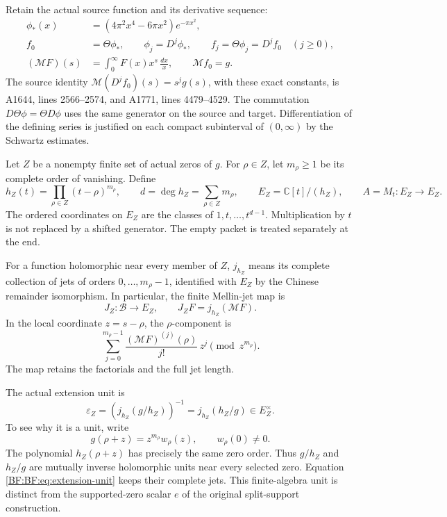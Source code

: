Retain the actual source function and its derivative sequence:
\begin{equation}
\begin{split}
\phi_*(x)&=(4\pi^2x^4-6\pi x^2)e^{-\pi x^2},\\
f_0&=\Theta\phi_*,
\qquad \phi_j=D^j\phi_*,
\qquad f_j=\Theta\phi_j=D^jf_0\quad(j\ge0),\\
(\mathcal MF)(s)&=\int_0^\infty F(x)x^s\,\frac{dx}{x},
\qquad \mathcal Mf_0=g.
\end{split}
\tag{BF.02}\label{BF:BF:eq:theta-source}
\end{equation}
The source identity \(\mathcal M(D^jf_0)(s)=s^jg(s)\), with these exact
constants, is A1644, lines 2566--2574, and A1771, lines 4479--4529.
The commutation \(D\Theta\phi=\Theta D\phi\) uses the same generator on
the source and target.  Differentiation of the defining series is
justified on each compact subinterval of \((0,\infty)\) by the
Schwartz estimates.

Let \(Z\) be a nonempty finite set of actual zeros of \(g\).  For
\(\rho\in Z\), let \(m_\rho\ge1\) be its complete order of vanishing.
Define
\begin{equation}
h_Z(t)=\prod_{\rho\in Z}(t-\rho)^{m_\rho},\qquad
d=\deg h_Z=\sum_{\rho\in Z}m_\rho,\qquad
E_Z=\mathbb C[t]/(h_Z),\qquad
A=M_t:E_Z\longrightarrow E_Z.
\tag{BF.03}\label{BF:BF:eq:packet}
\end{equation}
The ordered coordinates on \(E_Z\) are the classes of
\(1,t,\ldots,t^{d-1}\).  Multiplication by \(t\) is not replaced by a
shifted generator.  The empty packet is treated separately at the end.

For a function holomorphic near every member of \(Z\), \(j_{h_Z}\)
means its complete collection of jets of orders \(0,\ldots,m_\rho-1\),
identified with \(E_Z\) by the Chinese remainder isomorphism.
In particular, the finite Mellin-jet map is
\[
J_Z:\mathcal B\longrightarrow E_Z,\qquad
J_ZF=j_{h_Z}(\mathcal MF).
\]
In the local coordinate \(z=s-\rho\), the \(\rho\)-component is
\[
\sum_{j=0}^{m_\rho-1}
\frac{(\mathcal MF)^{(j)}(\rho)}{j!}\,z^j
       \pmod{z^{m_\rho}}.
\]
The map retains the factorials and the full jet length.

The actual extension unit is
\begin{equation}
\varepsilon_Z
 =\left(j_{h_Z}(g/h_Z)\right)^{-1}
 =j_{h_Z}(h_Z/g)\in E_Z^\times.
\tag{BF.04}\label{BF:BF:eq:extension-unit}
\end{equation}
To see why it is a unit, write
\[
g(\rho+z)=z^{m_\rho}w_\rho(z),\qquad w_\rho(0)\ne0.
\]
The polynomial \(h_Z(\rho+z)\) has precisely the same zero order.
Thus \(g/h_Z\) and \(h_Z/g\) are mutually inverse holomorphic units
near every selected zero.  Equation \eqref{BF:BF:eq:extension-unit}
keeps their complete jets.  This finite-algebra unit is distinct from
the supported-zero scalar \(e\) of the original split-support
construction.

